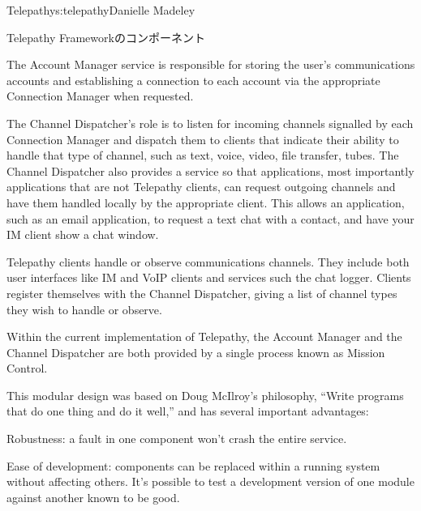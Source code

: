 \begin{aosachapter}{Telepathy}{s:telepathy}{Danielle Madeley}
\begin{aosasect1}{Telepathy Frameworkのコンポーネント}
\begin{aosaitemize}
  \item The Account Manager service is responsible for storing the
    user's communications accounts and establishing a connection to
    each account via the appropriate Connection Manager when
    requested.

  \item The Channel Dispatcher's role is to listen for incoming
    channels signalled by each Connection Manager and dispatch them to
    clients that indicate their ability to handle that type of
    channel, such as text, voice, video, file transfer, tubes.  The
    Channel Dispatcher also provides a service so that applications,
    most importantly applications that are not Telepathy clients, can
    request outgoing channels and have them handled locally by the
    appropriate client. This allows an application, such as an email
    application, to request a text chat with a contact, and have your
    IM client show a chat window.

  \item Telepathy clients handle or observe communications
    channels. They include both user interfaces like IM and VoIP
    clients and services such the chat logger. Clients register
    themselves with the Channel Dispatcher, giving a list of channel
    types they wish to handle or observe.

\end{aosaitemize}

Within the current implementation of Telepathy, the Account Manager
and the Channel Dispatcher are both provided by a single process known
as Mission Control.


This modular design was based on Doug McIlroy's philosophy, ``Write
programs that do one thing and do it well,'' and has several important
advantages:

\pagebreak

\begin{aosadescription}

  \item{Robustness:} a fault in one component won't crash the
  entire service.

  \item{Ease of development:} components can be replaced within
  a running system without affecting others. It's possible to test a
  development version of one module against another known to be
  good.


\end{aosadescription}
\end{aosasect1}
\end{aosachapter}
